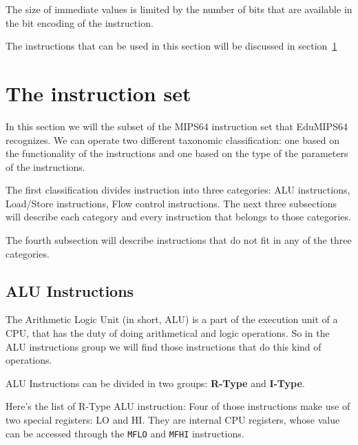 \documentclass[12pt]{report}
\newcommand{\EM}{EduMIPS64}
\newcommand{\MS}{MIPS64}
\begin{document}
The size of immediate values is limited by the number of bits that are available
in the bit encoding of the instruction. 


The instructions that can be used in this section will be discussed in
section~\ref{instructions}

\chapter{The instruction set}
\label{instructions}

In this section we will the subset of the \MS{} instruction set that \EM{}
recognizes. We can operate two different taxonomic classification: one based on
the functionality of the instructions and one based on the type of the
parameters of the instructions. 


The first classification divides instruction into three categories:
ALU instructions, Load/Store instructions, Flow control instructions. The next
three subsections will describe each category and every instruction that belongs
to those categories.

The fourth subsection will describe instructions that do not fit in any of the
three categories.


\section{ALU Instructions}
The Arithmetic Logic Unit (in short, ALU) is a part of the execution unit of a
CPU, that has the duty of doing arithmetical and logic operations. So in the ALU
instructions group we will find those instructions that do this kind of
operations.

ALU Instructions can be divided in two groups: \textbf{R-Type} and
\textbf{I-Type}. 

Here's the list of R-Type ALU instruction:
Four of those instructions make use of two special registers: LO and HI. They
are internal CPU registers, whose value can be accessed through the
\texttt{MFLO} and \texttt{MFHI} instructions.
\end{document}
